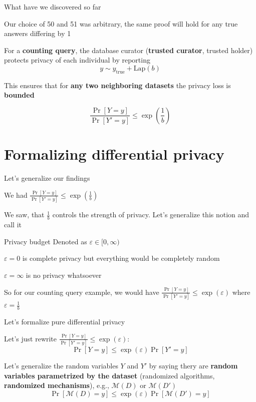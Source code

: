\documentclass[12pt,aspectratio=169,handout]{beamer}
\begin{document}
\begin{frame}{What have we discovered so far}

Our choice of 50 and 51 was arbitrary, the same proof will hold for any true answers differing by 1

For a \textbf{counting query}, the database curator (\textbf{trusted curator}, trusted holder) protects privacy of each individual by reporting
$$y \sim y_{\mathrm{true}} + \textrm{Lap}(b)$$

This ensures that for \textbf{any two neighboring datasets} the privacy loss is \textbf{bounded}

$$
\frac{\Pr[Y = y]}{\Pr[Y' = y]} \leq \exp(\frac{1}{b})
$$

\end{frame}




\section{Formalizing differential privacy}



\begin{frame}{Let's generalize our findings}

We had $\frac{\Pr[Y = y]}{\Pr[Y' = y]} \leq \exp(\frac{1}{b})$

We saw, that $\frac{1}{b}$ controls the strength of privacy. Let's generalize this notion and call it

\begin{block}{Privacy budget}
Denoted as $\varepsilon \in [0, \infty)$

$\varepsilon = 0$ is complete privacy but everything would be completely random

$\varepsilon = \infty$ is no privacy whatsoever
\end{block}
So for our counting query example, we would have
$\frac{\Pr[Y = y]}{\Pr[Y' = y]} \leq \exp(\varepsilon)$ where $\varepsilon = \frac{1}{b}$
\end{frame}


\begin{frame}{Let's formalize pure differential privacy}

Let's just rewrite $\frac{\Pr[Y = y]}{\Pr[Y' = y]} \leq \exp(\varepsilon)$:
$$
\Pr[Y = y] \leq \exp(\varepsilon) \Pr[Y' = y]
$$

Let's generalize the random variables $Y$ and $Y'$ by saying thery are \textbf{random variables parametrized by the dataset} (randomized algorithms, \textbf{randomized mechanisms}), e.g., $\mathcal{M}(D)$ or $\mathcal{M}(D')$
$$
\Pr[\mathcal{M}(D) = y] \leq \exp(\varepsilon) \Pr[\mathcal{M}(D') = y]
$$
\end{frame}
\end{document}
